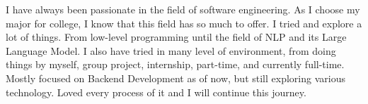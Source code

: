 

\begin{cvparagraph}

I have always been passionate in the field of software engineering. As I choose my major for college, I know that this field has so much to offer. I tried and explore a lot of things. From low-level programming until the field of NLP and its Large Language Model. I also have tried in many level of environment, from doing things by myself, group project, internship, part-time, and currently full-time. Mostly focused on Backend Development as of now, but still exploring various technology. Loved every process of it and I will continue this journey.

\end{cvparagraph}
